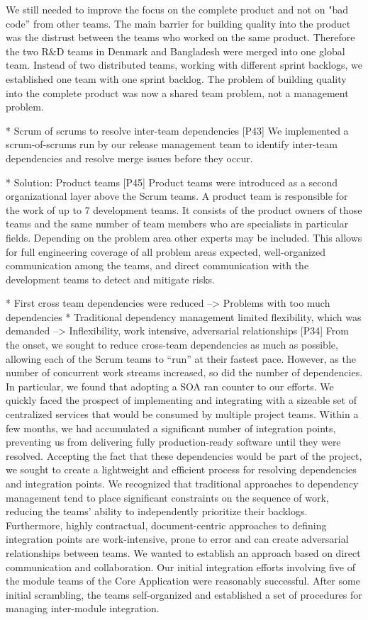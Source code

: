 \documentclass[preprint,authoryear,12pt]{elsarticle}
\begin{document}
We still needed to improve the focus on the complete product and not on "bad
code” from other teams. The main barrier for building quality into the product
was the distrust between the teams who worked on the same product. Therefore the
two R\&D teams in Denmark and Bangladesh were merged into one global team.
Instead of two distributed teams, working with different sprint backlogs, we
established one team with one sprint backlog. The problem of building quality
into the complete product was now a shared team problem, not a management
problem.


* Scrum of scrums to resolve inter-team dependencies
[P43]
We implemented a scrum-of-scrums run by our release management team to identify
inter-team dependencies and resolve merge issues before they occur.


* Solution: Product teams
[P45]
Product teams were introduced as a second organizational layer above the Scrum
teams. A product team is responsible for the work of up to 7 development teams.
It consists of the product owners of those teams and the same number of team
members who are specialists in particular fields. Depending on the problem area
other experts may be included. This allows for full engineering coverage of all
problem areas expected, well-organized communication among the teams, and direct
communication with the development teams to detect and mitigate risks.





* First cross team dependencies were reduced --> Problems with too much dependencies
* Traditional dependency management limited flexibility, which was demanded --> Inflexibility, work intensive, adversarial relationships
[P34]
From the onset, we sought to reduce cross-team dependencies as much as possible,
allowing each of the Scrum teams to “run” at their fastest pace.  However, as
the number of concurrent work streams increased, so did the number of
dependencies.  In particular, we found that adopting a SOA ran counter to our
efforts.
We quickly faced the prospect of implementing and integrating with a sizeable
set of centralized services that would be consumed by multiple project teams.
Within a few months, we had accumulated a significant number of integration
points, preventing us from delivering fully production-ready software until they
were resolved.
Accepting the fact that these dependencies would be part of the project, we
sought to create a lightweight and efficient process for resolving dependencies
and integration points.  We recognized that traditional approaches to dependency
management tend to place significant constraints on the sequence of work,
reducing the teams’ ability to independently prioritize their backlogs. 
Furthermore, highly contractual, document-centric approaches to defining
integration points are work-intensive, prone to error and can create adversarial
relationships between teams.  We wanted to establish an approach based on direct
communication and collaboration.
Our initial integration efforts involving five of the module teams of the Core
Application were reasonably successful. After some initial scrambling, the teams
self-organized and established a set of procedures for managing inter-module
integration.
\end{document}
